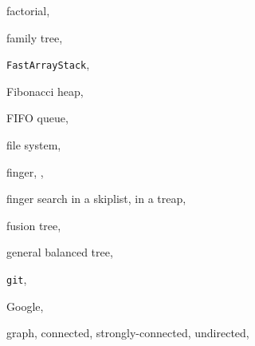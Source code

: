 \documentclass[10pt]{book}
\theoremstyle{plain}
\theoremstyle{definition}
\begin{document}
\begin{theindex}
  \indexspace

  \item factorial, 
  \item family tree, 
  \item \texttt{FastArrayStack}, 
  \item Fibonacci heap, 
  \item FIFO queue, 
  \item file system, 
  \item finger, , 
  \item finger search
    \subitem in a skiplist, 
    \subitem in a treap, 
  \item fusion tree, 

  \indexspace

  \item general balanced tree, 
  \item \texttt{git}, 
  \item Google, 
  \item graph, 
    \subitem connected, 
    \subitem strongly-connected, 
    \subitem undirected, 

  \indexspace


\end{theindex}
\end{document}
